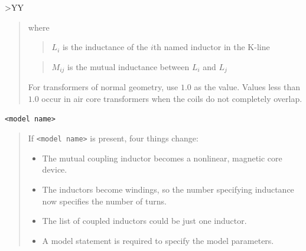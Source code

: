 \begin{longtable}[Hh]{>{\setlength{\hsize}{.2\hsize}}YY}
\begin{quote}
  where
  \begin{quote}
    $L_i$ is the inductance of the $i$th named inductor in the K-line
  \end {quote}
  \begin{quote}
    $M_{ij}$ is the mutual inductance between $L_i$ and $L_j$
  \end {quote}
  For transformers of normal geometry, use $1.0$ as the value. Values less
  than $1.0$ occur in air core transformers when the coils do not completely
  overlap.
\end{quote}
\texttt{<model name>}
\begin{quote}
  If \texttt{<model name>} is present, four things change:
  \begin{itemize}
    \item The mutual coupling inductor becomes a nonlinear, magnetic core device.
    \item The inductors become windings, so the number specifying inductance now
          specifies the number of turns.
    \item The list of coupled inductors could be just one inductor.
    \item A model statement is required to specify the model parameters.
  \end{itemize}
\end{quote}
\\ \hline

\end{longtable}

\addtocounter{table}{-1}

